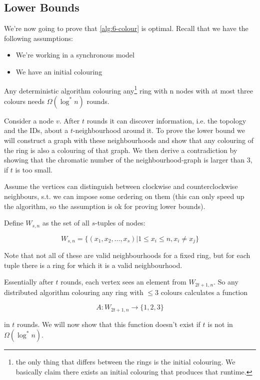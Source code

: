 \subsection{Lower Bounds}

We're now going to prove that \ref{alg:6-colour} is optimal. Recall that we have the following assumptions:

\begin{itemize}
\item We're working in a synchronous model
\item We have an initial colouring
\end{itemize}

\begin{thm}\label{thm:ring_colour_lowerbound} Any deterministic algorithm colouring any\footnote{the only thing that differs between the rings is the initial colouring. We basically claim there exists an initial colouring that produces that runtime.} ring with n nodes with at most three colours needs $\Omega(\log^* n)$ rounds.
\end{thm}

Consider a node $v$. After $t$ rounds it can discover information, i.e. the topology and the IDs, about a $t$-neighbourhood around it. To prove the lower bound we will construct a graph with these neighbourhoods and show that any colouring of the ring is also a colouring of that graph. We then derive a contradiction by showing that the chromatic number of the neighbourhood-graph is larger than 3, if $t$ is too small.

Assume the vertices can distinguish between clockwise and counterclockwise neighbours, s.t. we can impose some ordering on them (this can only speed up the algorithm, so the assumption is ok for proving lower bounds).

Define $W_{s,n}$ as the set of all $s$-tuples of nodes:

\[W_{s,n} = \{(x_1,x_2,\ldots,x_s) | 1 \leq x_i\leq n, x_i\neq x_j\}\]

Note that not all of these are valid neighbourhoods for a fixed ring, but for each tuple there is a ring for which it is a valid neighbourhood.

Essentially after $t$ rounds, each vertex sees an element from $W_{2t+1,n}$. So any distributed algorithm colouring any ring with $\leq 3$ colours calculates a function

\[A:W_{2t+1,n} \longrightarrow \{1,2,3\}\]

in $t$ rounds. We will now show that this function doesn't exist if $t$ is not in $\Omega(\log^*n)$.

